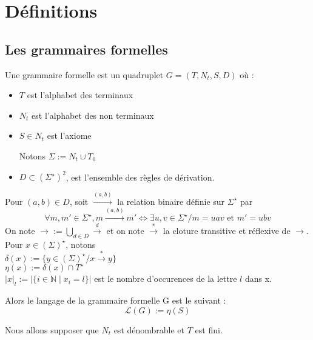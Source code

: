 \documentclass[a4paper,12pt]{article}
\title{\letitle}
\author{\leauthor}
\date{}
\newcommand{\norm}[1]{\lvert #1 \rvert}
\begin{document}
    \maketitle

\section{Définitions}

\subsection{Les grammaires formelles}

Une grammaire formelle est un quadruplet $G = (T,N_t,S,D)$ où :

\begin{itemize}
\item $T$ est l'alphabet des terminaux
\item $N_t$ est l'alphabet des non terminaux
\item $S \in N_t$ est l'axiome

Notons $\Sigma := N_t \cup T_0$
\item $D \subset (\Sigma ^ \star )^2$, est l'ensemble des règles de dérivation.
\end{itemize}
Pour $(a,b) \in D$, soit $\overset{(a,b)}{\rightarrow}$ la relation binaire définie sur $\Sigma^\star$ par
\begin{equation*}
\forall m,m' \in \Sigma^\star, m \overset{(a,b)}{\rightarrow} m' \iff \exists u,v \in \Sigma^\star / m = uav \text{ et } m' = ubv
\end{equation*}
On note $\rightarrow := \bigcup_{d \in D} \overset{d}{\rightarrow}$ et on note $\overset{*}{\rightarrow}$ la cloture transitive et réflexive de $\rightarrow$.\\
Pour $x \in (\Sigma)^\star$, notons\\
$\delta(x) := \{y \in (\Sigma)^\star / x \overset{*}{\rightarrow} y\}$\\
$\eta(x) := \delta(x) \cap T^\star$\\
$\norm{x}_l := \norm{\{i \in \mathbb{N} \mid x_i = l \}}$ est le nombre d'occurences de la lettre $l$ dans x.

Alors le langage de la grammaire formelle  G est le suivant :
\begin{equation*}\mathcal{L} (G) := \eta(S)\end{equation*}

Nous allons supposer que $N_t$ est dénombrable et $T$ est fini.
\end{document}
